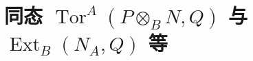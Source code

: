 \section{同态 \texorpdfstring{$\operatorname{Tor}^{A}(P\otimes_{B}N,Q)$}{TorA(P@N,Q)} 与 \texorpdfstring{$\operatorname{Ext}_{B}(N_{A},Q)$}{ExtB(NA,Q)} 等}
